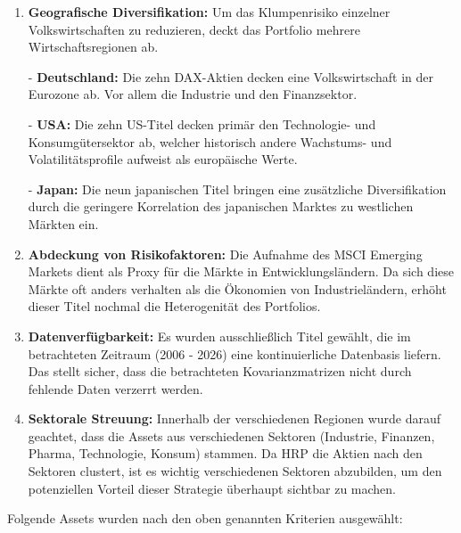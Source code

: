 \documentclass[parskip=half]{scrartcl}
\begin{document}
	\begin{enumerate}
		\item \textbf{Geografische Diversifikation:} Um das Klumpenrisiko einzelner Volkswirtschaften zu reduzieren, deckt das Portfolio mehrere Wirtschaftsregionen ab.
		
		- \textbf{Deutschland:} Die zehn DAX-Aktien decken eine Volkswirtschaft in der Eurozone ab. Vor allem die Industrie und den Finanzsektor.
		
		- \textbf{USA:} Die zehn US-Titel decken primär den Technologie- und Konsumgütersektor ab, welcher historisch andere Wachstums- und Volatilitätsprofile aufweist als europäische Werte.
		
		- \textbf{Japan:} Die neun japanischen Titel bringen eine zusätzliche Diversifikation durch die geringere Korrelation des japanischen Marktes zu westlichen Märkten ein.
		
		\item \textbf{Abdeckung von Risikofaktoren:} Die Aufnahme des MSCI Emerging Markets dient als Proxy für die Märkte in Entwicklungsländern. Da sich diese Märkte oft anders verhalten als die Ökonomien von Industrieländern, erhöht dieser Titel nochmal die Heterogenität des Portfolios. 
		
		\item \textbf{Datenverfügbarkeit:} Es wurden ausschließlich Titel gewählt, die im betrachteten Zeitraum (2006 - 2026) eine kontinuierliche Datenbasis liefern. Das stellt sicher, dass die betrachteten Kovarianzmatrizen nicht durch fehlende Daten verzerrt werden.
		
		\item \textbf{Sektorale Streuung:} Innerhalb der verschiedenen Regionen wurde darauf geachtet, dass die Assets aus verschiedenen Sektoren (Industrie, Finanzen, Pharma, Technologie, Konsum) stammen. Da HRP die Aktien nach den Sektoren clustert, ist es wichtig verschiedenen Sektoren abzubilden, um den potenziellen Vorteil dieser Strategie überhaupt sichtbar zu machen.
		
	\end{enumerate}
	
	\clearpage
	
	Folgende Assets wurden nach den oben genannten Kriterien ausgewählt:
	
\end{document}
